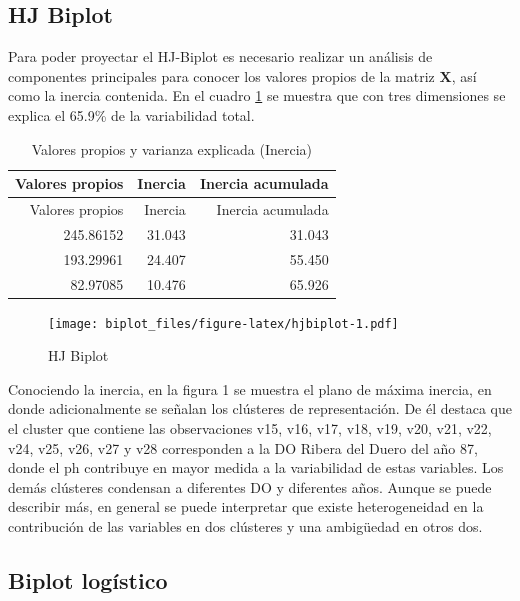 \documentclass[
  10pt,
  spanish,
]{article}
\begin{document}
\hypertarget{hj-biplot}{%
\subsection{HJ Biplot}\label{hj-biplot}}

Para poder proyectar el HJ-Biplot es necesario realizar un análisis de
componentes principales para conocer los valores propios de la matriz
\(\mathbf{X}\), así como la inercia contenida. En el cuadro
\ref{tab:inercia} se muestra que con tres dimensiones se explica el
65.9\% de la variabilidad total.

\begin{longtable}[]{@{}rrr@{}}
\caption{Valores propios y varianza explicada (Inercia)
\label{tab:inercia}}\tabularnewline
\toprule
Valores propios & Inercia & Inercia acumulada\tabularnewline
\midrule
\endfirsthead
\toprule
Valores propios & Inercia & Inercia acumulada\tabularnewline
\midrule
\endhead
245.86152 & 31.043 & 31.043\tabularnewline
193.29961 & 24.407 & 55.450\tabularnewline
82.97085 & 10.476 & 65.926\tabularnewline
\bottomrule
\end{longtable}

\begin{figure}
\centering
\texttt{[image: biplot\_files/figure-latex/hjbiplot-1.pdf]}
\caption{HJ Biplot}
\end{figure}

Conociendo la inercia, en la figura 1 se muestra el plano de máxima
inercia, en donde adicionalmente se señalan los clústeres de
representación. De él destaca que el cluster que contiene las
observaciones v15, v16, v17, v18, v19, v20, v21, v22, v24, v25, v26, v27
y v28 corresponden a la DO Ribera del Duero del año 87, donde el ph
contribuye en mayor medida a la variabilidad de estas variables. Los
demás clústeres condensan a diferentes DO y diferentes años. Aunque se
puede describir más, en general se puede interpretar que existe
heterogeneidad en la contribución de las variables en dos clústeres y
una ambigüedad en otros dos.

\hypertarget{biplot-loguxedstico}{%
\subsection{Biplot logístico}\label{biplot-loguxedstico}}
\end{document}
